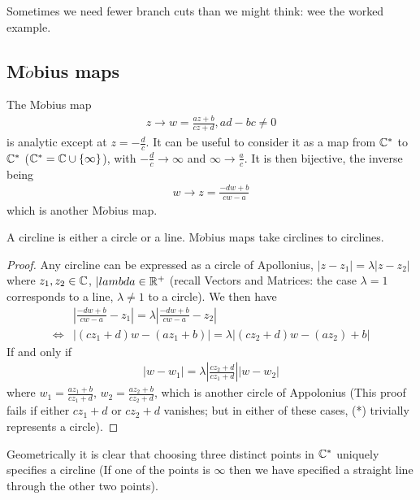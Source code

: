 \documentclass[a4paper]{article}
\begin{document}
Sometimes we need fewer branch cuts than we might think: wee the worked example.

\subsection{M$\ddot{o}$bius maps}
The M$\ddot{o}$bius map
\begin{equation*}
\begin{aligned}
z \to w=\frac{az+b}{cz+d}, ad-bc \neq 0
\end{aligned}
\end{equation*}
is analytic except at $z=-\frac{d}{c}$. It can be useful to consider it as a map from $\mathbb{C}^*$ to $\mathbb{C}^*$ ($\mathbb{C}^* = \mathbb{C} \cup \{\infty\}$), with $-\frac{d}{c} \to \infty$ and $\infty \to \frac{a}{c}$. It is then bijective, the inverse being
\begin{equation*}
\begin{aligned}
w \to z=\frac{-dw+b}{cw-a}
\end{aligned}
\end{equation*}
which is another M$\ddot{o}$bius map.

A circline is either a circle or a line. M$\ddot{o}$bius maps take circlines to circlines.
\begin{proof}
Any circline can be expressed as a circle of Apollonius, $|z-z_1|=\lambda|z-z_2|$ where $z_1,z_2 \in \mathbb{C}$, $|lambda \in \mathbb{R}^+$ (recall Vectors and Matrices: the case $\lambda = 1$ corresponds to a line, $\lambda \neq 1$ to a circle). We then have
\begin{equation*}\tag{*}
\begin{aligned}
&\left|\frac{-dw+b}{cw-a} - z_1\right| = \lambda \left|\frac{-dw+b}{cw-a} - z_2\right|\\
\iff &|(cz_1+d)w-(az_1+b)| = \lambda |(cz_2+d)w-(az_2)+b|
\end{aligned}
\end{equation*}
If and only if
\begin{equation*}
\begin{aligned}
|w-w_1| = \lambda\left|\frac{cz_2+d}{cz_1+d}\right||w-w_2|
\end{aligned}
\end{equation*}
where $w_1 = \frac{az_1+b}{cz_1+d}$, $w_2 = \frac{az_2+b}{cz_2+d}$, which is another circle of Appolonius (This proof fails if either $cz_1+d$ or $cz_2+d$ vanishes; but in either of these cases, (*) trivially represents a circle).
\end{proof}

Geometrically it is clear that choosing three distinct points in $\mathbb{C}^*$ uniquely specifies a circline (If one of the points is $\infty$ then we have specified a straight line through the other two points).
\end{document}
